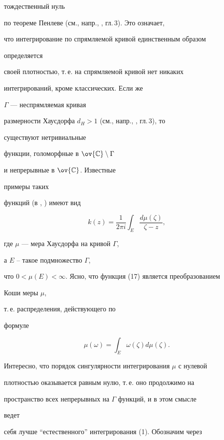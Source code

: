 тождественный нуль 


по теореме Пенлеве (см., напр., \cite{18}, гл.\,3). Это означает, 


что интегрирование по спрямляемой кривой единственным образом 


определяется 


своей плотностью, т.\,е. на спрямляемой кривой нет никаких  


интегрирований, кроме классических. Если же 


$\Gamma$ --- неспрямляемая кривая 


размерности Хаусдорфа $d_H>1$ (см., напр., \cite{18}, гл.\,3), то 


существуют нетривиальные 


функции, голоморфные в $\ov{\Bbb C}\setminus\Gamma$ 


и непрерывные в $\ov{\Bbb C}$. Известные 


примеры таких 


функций (в \cite{18}, \cite{19}) имеют вид 


\begin{equation} 


k(z)=\frac{1}{2\pi i}\int_E\frac{d\mu(\zeta)}{\zeta-z}, 


\end{equation} 


где $\mu$ --- мера Хаусдорфа на кривой $\Gamma$, 


а $E$ -- такое подмножество $\Gamma$, 


что $0<\mu(E)<\infty$. Ясно, что функция (17) является преобразованием 


Коши меры $\mu$, 


т.\,е. распределения, действующего по 


формуле 


\begin{equation} 


\mu(\omega)=\int_E\omega(\zeta)d\mu(\zeta). 


\end{equation} 


Интересно, что порядок сингулярности интегрирования $\mu$ с нулевой 


плотностью оказывается равным нулю, т.\,е. оно продолжимо на  


пространство всех непрерывных на $\Gamma$ функций, и в этом смысле 


ведет 


себя лучше ``естественного'' интегрирования (1). Обозначим через 


